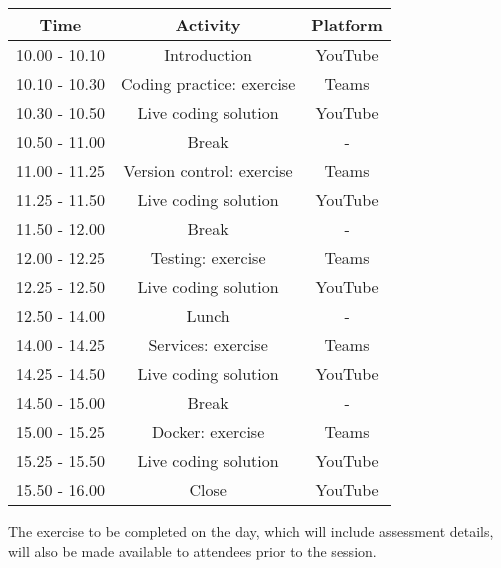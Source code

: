 \documentclass{article}
\begin{document}
\begin{table}[h!]
    \centering \begin{tabular}{c|c|c}
         Time & Activity & Platform  \\ \hline 10.00 - 10.10 &
         Introduction & YouTube \\ \hline 10.10 - 10.30 & Coding practice:
         exercise & Teams \\ \hline 10.30 - 10.50 & Live coding solution
         & YouTube \\ \hline 10.50 - 11.00 & Break & - \\ \hline 11.00
         - 11.25 & Version control: exercise & Teams \\ \hline 11.25 -
         11.50 & Live coding solution & YouTube \\ \hline 11.50 - 12.00 &
         Break & - \\ \hline 12.00 - 12.25 & Testing: exercise & Teams \\
         \hline 12.25 - 12.50 & Live coding solution & YouTube \\ \hline
         12.50 - 14.00 & Lunch & - \\ \hline 14.00 - 14.25 & Services:
         exercise & Teams \\ \hline 14.25 - 14.50 & Live coding solution
         & YouTube \\ \hline 14.50 - 15.00 & Break & - \\ \hline 15.00
         - 15.25 & Docker: exercise & Teams \\ \hline 15.25 - 15.50 &
         Live coding solution & YouTube \\ \hline 15.50 - 16.00 & Close &
         YouTube \\ \hline
    \end{tabular}
\end{table}

The exercise to be completed on the day, which will include assessment
details, will also be made available to attendees prior to the session.
\end{document}
